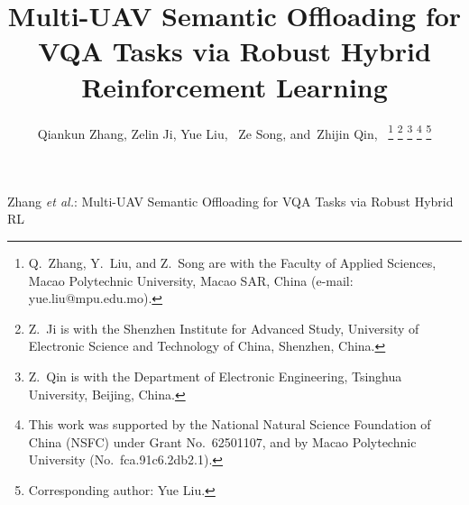\documentclass[journal,twoside]{IEEEtran}
\begin{document}
\title{Multi-UAV Semantic Offloading for VQA Tasks via Robust Hybrid Reinforcement Learning}

\author{Qiankun Zhang,
        Zelin Ji,
        Yue Liu,~
        Ze Song,
        and~Zhijin Qin,~
\thanks{Q.\ Zhang, Y.\ Liu, and Z.\ Song are with the Faculty of Applied Sciences,
Macao Polytechnic University, Macao SAR, China (e-mail: yue.liu@mpu.edu.mo).}
\thanks{Z.\ Ji is with the Shenzhen Institute for Advanced Study, University of
Electronic Science and Technology of China, Shenzhen, China.}
\thanks{Z.\ Qin is with the Department of Electronic Engineering, Tsinghua
University, Beijing, China.}
\thanks{This work was supported by the National Natural Science Foundation of
China (NSFC) under Grant No.~62501107, and by Macao Polytechnic University
(No.~fca.91c6.2db2.1).}
\thanks{Corresponding author: Yue Liu.}}

%
{Zhang \MakeLowercase{\textit{et al.}}: Multi-UAV Semantic Offloading for VQA Tasks via Robust Hybrid RL}

\maketitle
\end{document}
